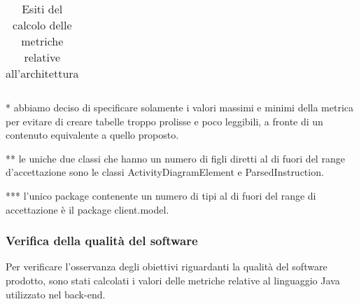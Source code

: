 \begin{longtable}{|p{5.5cm}|p{2.25cm}|p{2.25cm}|p{2.25cm}|}
		\caption{Esiti del calcolo delle metriche relative all'architettura}
		\end{longtable}
	* abbiamo deciso di specificare solamente i valori massimi e minimi della metrica per evitare di creare tabelle troppo prolisse e poco leggibili, a fronte di un contenuto equivalente a quello proposto.
	
	** le uniche due classi che hanno un numero di figli diretti al di fuori del range d'accettazione sono le classi ActivityDiagramElement e ParsedInstruction.
	
	*** l'unico package contenente un numero di tipi al di fuori del range di accettazione è il package client.model.
	
		\subsubsection{Verifica della qualità del software}
		Per verificare l'osservanza degli obiettivi riguardanti la qualità del software prodotto, sono stati calcolati i valori delle metriche relative al linguaggio Java utilizzato nel back-end.
		

